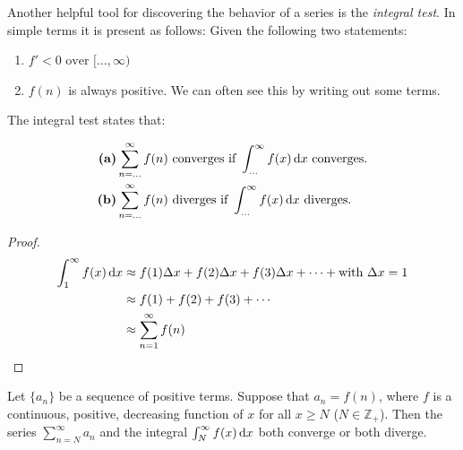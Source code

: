 Another helpful tool for discovering the behavior of a series is the
\emph{integral test}. In simple terms it is present as follows:
Given the following two statements:
\begin{enumerate}
  \item \(f' < 0 \text{ over } [\ldots, \infty) \)
  \item \(f(n)\) is always positive. We can often see this by writing out some terms.
\end{enumerate}
The integral test states that:

\begin{align*}
  \text{\textbf{(a)}} & \sum^\infty_{n=\ldots} f(n) \text{ converges if }
  \int_{\ldots}^{\infty} f(x) \,\mathrm{d} x \text{ converges.}  \\
  \text{\textbf{(b)}} & \sum^\infty_{n=\ldots} f(n) \text{ diverges if } \int_{\ldots}^{\infty} f(x) \,\mathrm{d} x \text{ diverges.}
\end{align*}

\begin{proof}
  \begin{align*}
    \int^\infty_1 f(x) \,\mathrm{d} x
    &\approx f(1) \Delta x + f(2) \Delta x + f(3) \Delta x + \cdots + \text{with } \Delta x = 1 \\
    &\approx f(1) + f(2)+f(3)+\cdots \\
    &\approx \sum^\infty_{n=1} f(n)\qedhere
  \end{align*}
\end{proof}

\begin{theorem}\label{th:seriesint}
  Let $\{a_n\}$ be a sequence of positive terms. Suppose that $a_n = f(n)$,
  where $f$ is a continuous, positive, decreasing function of $x$ for all $x
  \geq N$ ($N \in \mathbb{Z_+}$). Then the series $\sum_{n=N}^\infty a_n$ and
  the integral $\int_N^\infty f(x)\,\mathrm{d} x$ both converge or both
  diverge.\cite[p.~554]{thomas}
\end{theorem}

